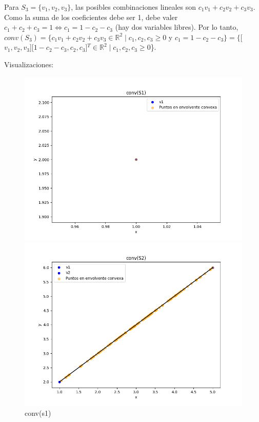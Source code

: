 \documentclass{article}
\begin{document}
Para $S_3 = \{v_1, v_2, v_3\}$, las posibles combinaciones lineales son $c_1 v_1 + c_2 v_2 + c_3 v_3$. Como la suma de los coeficientes debe ser 1, debe valer $c_1 + c_2 + c_3 = 1 \iff c_1 = 1 - c_2 - c_3$ (hay dos variables libres). Por lo tanto, $conv(S_3) = \{c_1 v_1+ c_2 v_2 + c_3 v_3\in \mathbb{R}^2 \mid c_1, c_2, c_3 \geq 0$ y $ c_1 = 1- c_2-c_3\} = \{$[$v_1, v_2, v_3$][$1-c_2 - c_3, c_2, c_3$]$^T\in \mathbb{R}^2 \mid c_1, c_2, c_3 \geq 0$\}.

Visualizaciones:

\begin{figure}[H]
   \centering
    \begin{minipage}{0.45\textwidth}
        \centering
        \includegraphics[width=\textwidth]{imagenes/conv(s1).png}
        \caption{conv(s1)}
        \label{fig:grafico1}
    \end{minipage}
    \hfill
    \begin{minipage}{0.45\textwidth}
        \centering
        \includegraphics[width=\textwidth]{imagenes/conv(s2).png}

\end{minipage}
\end{figure}
\end{document}
